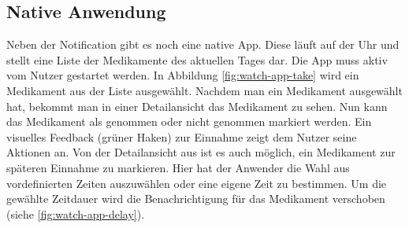 \subsection{Native Anwendung}
Neben der Notification gibt es noch eine native App. Diese läuft auf der Uhr und stellt eine Liste der Medikamente des aktuellen Tages dar. Die App muss aktiv vom Nutzer gestartet werden. In Abbildung \ref{fig:watch-app-take} wird ein Medikament aus der Liste ausgewählt. Nachdem man ein Medikament ausgewählt hat, bekommt man in einer Detailansicht das Medikament zu sehen. Nun kann das Medikament als genommen oder nicht genommen markiert werden. Ein visuelles Feedback (grüner Haken) zur Einnahme zeigt dem Nutzer seine Aktionen an. Von der Detailansicht aus ist es auch möglich, ein Medikament zur späteren Einnahme zu markieren. Hier hat der Anwender die Wahl aus vordefinierten Zeiten auszuwählen oder eine eigene Zeit zu bestimmen. Um die gewählte Zeitdauer wird die Benachrichtigung für das Medikament verschoben (siehe \ref{fig:watch-app-delay}). 

